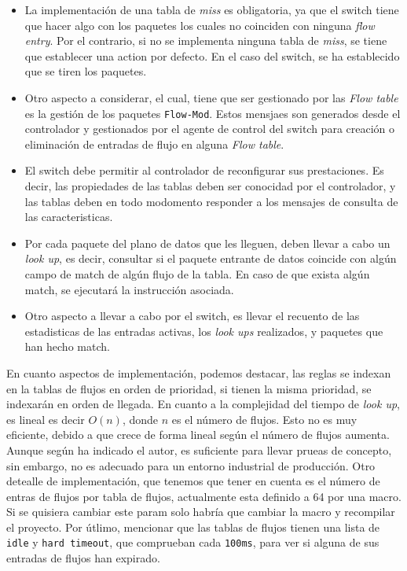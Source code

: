 \begin{itemize}
    \item La implementación de una tabla de \textit{miss} es obligatoria, ya que el switch tiene que hacer algo con los paquetes los cuales no coinciden con ninguna \textit{flow entry}. Por el contrario, si no se implementa ninguna tabla de \textit{miss}, se tiene que establecer una action por defecto. En el caso del switch, se ha establecido que se tiren los paquetes.

    \item Otro aspecto a considerar, el cual, tiene que ser gestionado por las \textit{Flow table} es la gestión de los paquetes \texttt{Flow-Mod}. Estos mensjaes son generados desde el controlador y gestionados por el agente de control del switch para creación o eliminación de entradas de flujo en alguna \textit{Flow table}.

    \item El switch debe permitir al controlador de reconfigurar sus prestaciones. Es decir, las propiedades de las tablas deben ser conocidad por el controlador, y las tablas deben en todo modomento responder a los mensajes de consulta de las caracteristicas.

    \item Por cada paquete del plano de datos que les lleguen, deben llevar a cabo un \textit{look up},  es decir, consultar si el paquete entrante de datos coincide con algún campo de match de algún flujo de la tabla. En caso de que exista algún match, se ejecutará la instrucción asociada.

    \item  Otro aspecto a llevar a cabo por el switch, es llevar el recuento de las estadisticas de las entradas activas, los \textit{look ups} realizados, y paquetes que han hecho match.
\end{itemize}


En cuanto aspectos de implementación, podemos destacar, las reglas se indexan en la tablas de flujos en orden de prioridad, si tienen la misma prioridad, se indexarán en orden de llegada. En cuanto a la complejidad del tiempo de \textit{look up}, es lineal es decir $O(n)$, donde $n$ es el número de flujos. Esto no es muy eficiente, debido a que crece de forma lineal según el número de flujos aumenta. Aunque según ha indicado el autor, es suficiente para llevar prueas de concepto, sin embargo, no es adecuado para un entorno industrial de producción. Otro detealle de implementación, que tenemos que tener en cuenta es el número de entras de flujos por tabla de flujos, actualmente esta definido a 64 por una macro.  Si se quisiera cambiar este param solo habría que cambiar la macro y recompilar el proyecto. Por útlimo, mencionar que las tablas de flujos tienen una lista de \texttt{idle} y \texttt{hard timeout}, que comprueban cada \texttt{100ms}, para ver si alguna de sus entradas de flujos han expirado.

